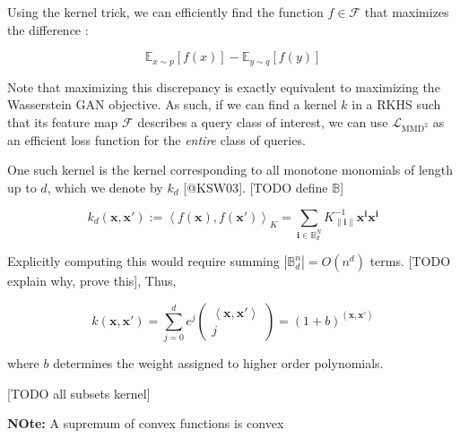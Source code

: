 \documentclass[
]{article}
\begin{document}
Using the kernel trick, we can efficiently find the function
\(f \in \mathcal{F}\) that maximizes the difference :

\[\mathbb{E}_{x\sim p}[f(x)] - \mathbb{E}_{y\sim q}[f(y)]\]

Note that maximizing this discrepancy is exactly equivalent to
maximizing the Wasserstein GAN objective. As such, if we can find a
kernel \(k\) in a RKHS such that its feature map \(\mathcal{F}\)
describes a query class of interest, we can use
\(\mathcal{L}_{\mathrm{MMD}^2}\) as an efficient loss function for the
\emph{entire} class of queries.

One such kernel is the kernel corresponding to all monotone monomials of
length up to \(d\), which we denote by \(k_d\) {[}@KSW03{]}. {[}TODO
define \(\mathbb{B}\){]}

\[
  k_d\left(\mathbf{x}, \mathbf{x}'\right):=\left\langle f(\mathbf{x}), f\left(\mathbf{x}'\right)\right\rangle_{K}=\sum_{\mathbf{i} \in \mathbb{B}^N_d} K_{\|\mathbf{i}\|}^{-1} \mathbf{x}^{\mathbf{i}} \mathbf{x}^{\mathbf{i}}
\]

Explicitly computing this would require summing
\(|\mathbb{B}_d^n| = O(n^d)\) terms. {[}TODO explain why, prove this{]},
Thus,

\[k\left(\mathbf{x}, \mathbf{x}'\right)=\sum_{j=0}^{d} e^j\left(\begin{array}{c}{\left\langle\mathbf{x}, \mathbf{x}'\right\rangle} \\ { j}\end{array}\right)=(1+b)^{\left(\mathbf{x}, \mathbf{x}'\right)}\]

where \(b\) determines the weight assigned to higher order polynomials.

{[}TODO all subsets kernel{]}

\textbf{NOte:} A supremum of convex functions is convex
\end{document}
